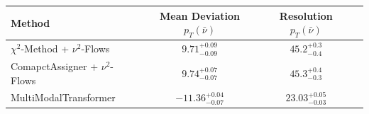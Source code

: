     \begin{tabular}{lccc}
        \toprule
        Method & Mean Deviation $p_{T}(\bar{\nu})$ & Resolution $p_{T}(\bar{\nu})$ \\
        \midrule
        $\chi^2$-Method + $\nu^2$-Flows & $9.71^{+0.09}_{-0.09}$ & $45.2^{+0.3}_{-0.4}$ \\
        ComapctAssigner + $\nu^2$-Flows & $9.74^{+0.07}_{-0.07}$ & $45.3^{+0.4}_{-0.3}$ \\
        MultiModalTransformer & $-11.36^{+0.04}_{-0.07}$ & $23.03^{+0.05}_{-0.03}$ \\
        \bottomrule
    \end{tabular}